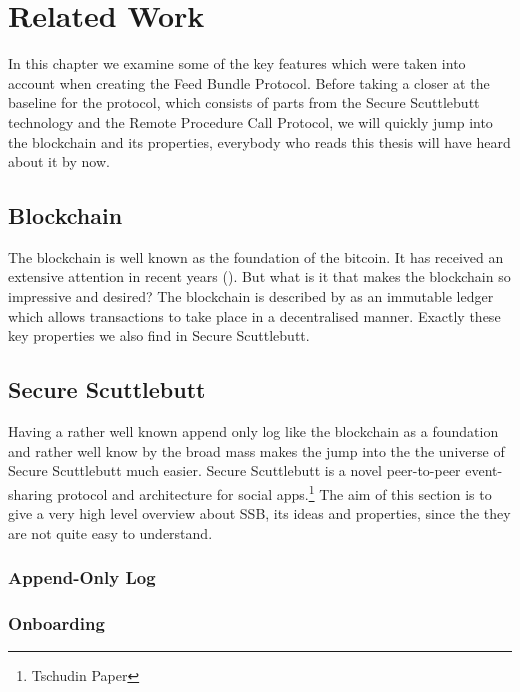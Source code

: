 \chapter{Related Work}
In this chapter we examine some of the key features which were taken into account when creating the
Feed Bundle Protocol. Before taking a closer at the baseline for the protocol, which consists of
parts from the Secure Scuttlebutt technology and the Remote Procedure Call Protocol, we will quickly
jump into the blockchain and its properties, everybody
who reads this thesis will have heard about it by now.
\section{Blockchain}
The blockchain is well known as the foundation of the bitcoin. It has received an extensive
attention in recent years (\citet{8029379}). But what is it that makes the blockchain so impressive
and desired? The blockchain is described by \citet{8029379} as an immutable ledger which allows transactions to take place in a decentralised manner. Exactly these key properties we also find
in Secure Scuttlebutt.
\section{Secure Scuttlebutt}
Having a rather well known append only log like the blockchain as a foundation and rather well know by the broad mass makes the jump into the the universe of Secure Scuttlebutt much easier.
Secure Scuttlebutt is a novel peer-to-peer event-sharing protocol and architecture for
social apps.\footnote{Tschudin Paper} The aim of this section is to give a very high level overview about SSB, its ideas
and properties, since the they are not quite easy to understand.

\subsection{Append-Only Log}

\subsection{Onboarding}
